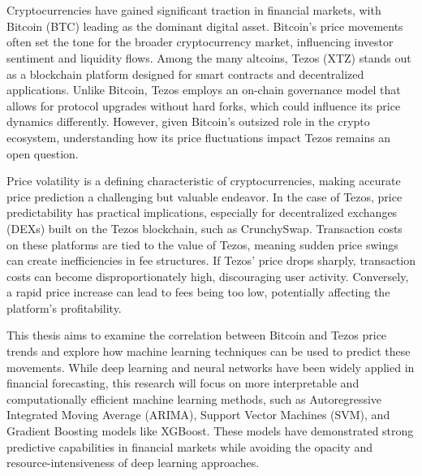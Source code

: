 
\chapter{}%
\label{ch:inleiding}

Cryptocurrencies have gained significant traction in financial markets, with Bitcoin (BTC) leading as the dominant digital asset. Bitcoin’s price movements often set the tone for the broader cryptocurrency market, influencing investor sentiment and liquidity flows. Among the many altcoins, Tezos (XTZ) stands out as a blockchain platform designed for smart contracts and decentralized applications. Unlike Bitcoin, Tezos employs an on-chain governance model that allows for protocol upgrades without hard forks, which could influence its price dynamics differently. However, given Bitcoin’s outsized role in the crypto ecosystem, understanding how its price fluctuations impact Tezos remains an open question.

Price volatility is a defining characteristic of cryptocurrencies, making accurate price prediction a challenging but valuable endeavor. In the case of Tezos, price predictability has practical implications, especially for decentralized exchanges (DEXs) built on the Tezos blockchain, such as CrunchySwap. Transaction costs on these platforms are tied to the value of Tezos, meaning sudden price swings can create inefficiencies in fee structures. If Tezos’ price drops sharply, transaction costs can become disproportionately high, discouraging user activity. Conversely, a rapid price increase can lead to fees being too low, potentially affecting the platform’s profitability.

This thesis aims to examine the correlation between Bitcoin and Tezos price trends and explore how machine learning techniques can be used to predict these movements. While deep learning and neural networks have been widely applied in financial forecasting, this research will focus on more interpretable and computationally efficient machine learning methods, such as Autoregressive Integrated Moving Average (ARIMA), Support Vector Machines (SVM), and Gradient Boosting models like XGBoost. These models have demonstrated strong predictive capabilities in financial markets while avoiding the opacity and resource-intensiveness of deep learning approaches.

